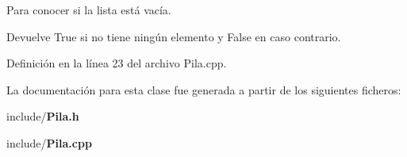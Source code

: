Para conocer si la lista está vacía. 

\begin{DoxyReturn}{Devuelve}
True si no tiene ningún elemento y False en caso contrario. 
\end{DoxyReturn}


Definición en la línea 23 del archivo Pila.\-cpp.



La documentación para esta clase fue generada a partir de los siguientes ficheros\-:\begin{DoxyCompactItemize}
\item 
include/{\bf Pila.\-h}\item 
include/{\bf Pila.\-cpp}\end{DoxyCompactItemize}
